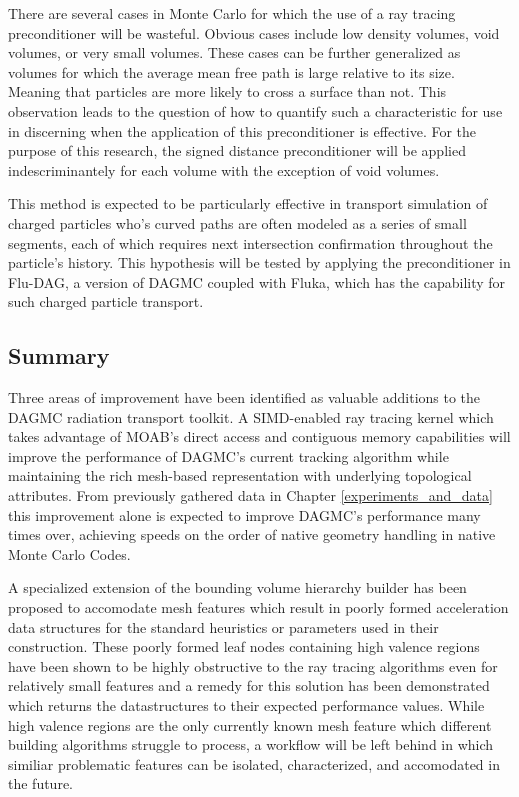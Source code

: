 \documentclass[12pt, a4paper]{article}
\begin{document}
There are several cases in Monte Carlo for which the use of a ray tracing preconditioner will be wasteful. Obvious cases include low density volumes, void volumes, or very small volumes. These cases can be further generalized as volumes for which the average mean free path is large relative to its size. Meaning that particles are more likely to cross a surface than not. This observation leads to the question of how to quantify such a characteristic for use in discerning when the application of this preconditioner is effective. For the purpose of this research, the signed distance preconditioner will be applied indescriminantely for each volume with the exception of void volumes.

This method is expected to be particularly effective in transport simulation of charged particles who's curved paths are often modeled as a series of small segments, each of which requires next intersection confirmation throughout the particle's history. This hypothesis will be tested by applying the preconditioner in Flu-DAG, a version of DAGMC coupled with Fluka\cite{Bohlen_2014}, which has the capability for such charged particle transport.

\subsection{Summary}

Three areas of improvement have been identified as valuable additions to the DAGMC radiation transport toolkit. A SIMD-enabled ray tracing kernel which takes advantage of MOAB's direct access and contiguous memory capabilities will improve the performance of DAGMC's current tracking algorithm while maintaining the rich mesh-based representation with underlying topological attributes. From previously gathered data in Chapter \ref{experiments_and_data} this improvement alone is expected to improve DAGMC's performance many times over, achieving speeds on the order of native geometry handling in native Monte Carlo Codes.

A specialized extension of the bounding volume hierarchy builder has been proposed to accomodate mesh features which result in poorly formed acceleration data structures for the standard heuristics or parameters used in their construction. These poorly formed leaf nodes containing high valence regions have been shown to be highly obstructive to the ray tracing algorithms even for relatively small features and a remedy for this solution has been demonstrated which returns the datastructures to their expected performance values. While high valence regions are the only currently known mesh feature which different building algorithms struggle to process, a workflow will be left behind in which similiar problematic features can be isolated, characterized, and accomodated in the future.
\end{document}
